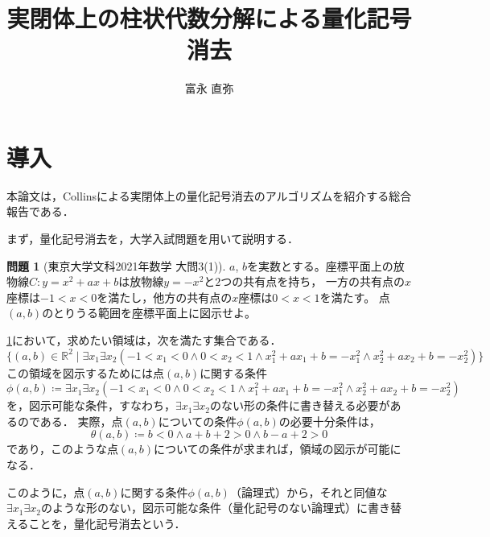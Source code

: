 \documentclass[uplatex, dvipdfmx]{jsarticle}
\numberwithin{equation}{section}
\newcommand{\R}{\mathbb{R}}
\theoremstyle{definition}
\newtheorem{question}[definition]{問題}
\begin{document}
\title{実閉体上の柱状代数分解による量化記号消去}
\author{富永 直弥}
\maketitle

\tableofcontents

\section{導入}\label{section:1}

     本論文は，Collins\cite{MR0403962}による実閉体上の量化記号消去のアルゴリズムを紹介する総合報告である．

     まず，量化記号消去を，大学入試問題を用いて説明する．

     \begin{question}[東京大学文科2021年数学 大問3(1)]\label{question:ut2021}
          $a$, $b$を実数とする。座標平面上の放物線$C:y=x^2+ax+b$は放物線$y=-x^2$と$2$つの共有点を持ち，
          一方の共有点の$x$座標は$-1<x<0$を満たし，他方の共有点の$x$座標は$0<x<1$を満たす。
          点$(a,b)$のとりうる範囲を座標平面上に図示せよ。
     \end{question}

     \cref{question:ut2021}において，求めたい領域は，次を満たす集合である．
     \begin{equation}
          \{(a,b) \in \R^2 \mid \exists x_1 \exists x_2(-1 < x_1 < 0 \land 0 < x_2 < 1 \land x_1^2+ax_1+b = -x_1^2 \land x_2^2 + ax_2 + b = -x_2^2) \}
     \end{equation}
     この領域を図示するためには点$(a,b)$に関する条件
     \begin{equation}
          \phi(a,b) \coloneqq \exists x_1 \exists x_2(-1 < x_1 < 0 \land 0 < x_2 < 1 \land x_1^2+ax_1+b = -x_1^2 \land x_2^2 + ax_2 + b = -x_2^2)
     \end{equation}
     を，図示可能な条件，すなわち，$\exists x_1 \exists x_2$のない形の条件に書き替える必要があるのである．
     実際，点$(a,b)$についての条件$\phi(a,b)$の必要十分条件は，
     \begin{equation}
          \theta(a,b) \coloneqq b < 0 \land a+b+2>0 \land b-a+2>0
     \end{equation}
     であり，このような点$(a,b)$についての条件が求まれば，領域の図示が可能になる．
     
     このように，点$(a,b)$に関する条件$\phi(a,b)$（論理式）から，それと同値な
     $\exists x_1 \exists x_2$のような形のない，図示可能な条件（量化記号のない論理式）に書き替えることを，量化記号消去という．
\end{document}
